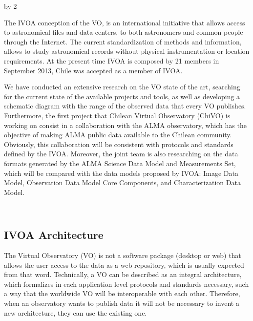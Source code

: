 \documentclass[11pt]{scrartcl}
\def\anzspalten{2}
\newlength{\kastenwidth}
\newenvironment{kasten}{
  \begin{lrbox}{\dummybox}
    \begin{minipage}{\linewidth}}
    {\end{minipage}
  \end{lrbox}
  \raisebox{-\depth}{\psshadowbox[cornersize=absolute,linearc=14pt,framesep=1em]{\usebox{\dummybox}}}\\[0.5em]}
\newenvironment{spalte}{
  \setlength\kastenwidth{1.2\textwidth}
  \divide\kastenwidth by \anzspalten
  \begin{minipage}[t]{\kastenwidth}}{\end{minipage}}
\begin{document}
\begin{lrbox}{\spalten}
{\begin{spalte}
\begin{kasten}
\begin{minipage}[t]{1.0\linewidth}
			The IVOA conception of the VO, is an international initiative that allows
			access to astronomical files and data centers, to both astronomers and common
			people through the Internet. The current standardization of methods and
			information, allows to study astronomical records without physical
			instrumentation or location requirements. At the present time IVOA is composed
			by 21 members in September 2013, Chile was accepted as a member of IVOA.
			
			We have conducted an extensive research on the VO state of the art, searching
			for the current state of the available projects and tools, as well as
			developing a schematic diagram with the range of the observed data that every
			VO publishes. Furthermore, the first project that Chilean Virtual Observatory
			(ChiVO) is working on consist in a collaboration with the ALMA observatory,
			which has the objective of making ALMA public data available to the Chilean
			community. Obviously, this collaboration will be consistent with protocols and
			standards defined by the IVOA. Moreover, the joint team is also researching on
			the data formats generated by the ALMA Science Data Model and Measurements Set,
			which will be compared with the data models proposed by IVOA: Image Data Model,
			Observation Data Model Core Components, and Characterization Data Model.
		\end{minipage} \hfill
\end{kasten}\hfill

	\begin{kasten}
        \section*{\hspace{0.2cm} {\color{red} IVOA Architecture} }
			\begin{minipage}{0.5\linewidth}
			The Virtual Observatory (VO) is not a software package (desktop or web) that
			allows the user access to the data as a web repository, which is usually
			expected from that word. Technically, a VO can be described as an integral
			architecture, which formalizes in each application level protocols and
			standards necessary, such a way that the worldwide VO will be interoperable with
			each other.  Therefore, when an observatory wants to publish data it will not be
			necessary to invent a new architecture, they can use the existing one.
			

\end{minipage}
\end{kasten}
\end{spalte}}
\end{lrbox}
\end{document}

